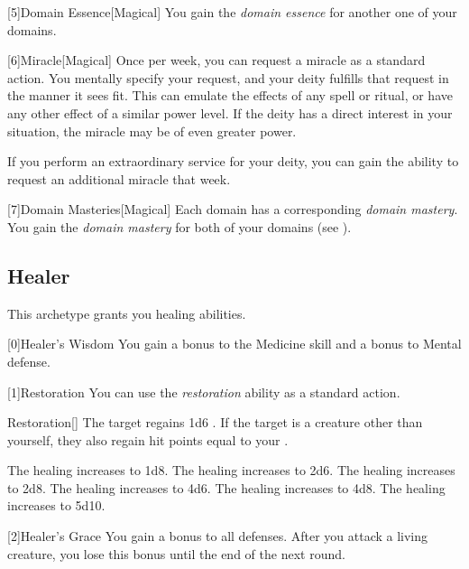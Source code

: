         [5]{Domain Essence}[Magical]
        You gain the \textit{domain essence} for another one of your domains.

        [6]{Miracle}[Magical]
        Once per week, you can request a miracle as a standard action.
        You mentally specify your request, and your deity fulfills that request in the manner it sees fit.
        This can emulate the effects of any spell or ritual, or have any other effect of a similar power level.
        If the deity has a direct interest in your situation, the miracle may be of even greater power.

        If you perform an extraordinary service for your deity, you can gain the ability to request an additional miracle that week.

        [7]{Domain Masteries}[Magical]
        Each domain has a corresponding \textit{domain mastery}.
        You gain the \textit{domain mastery} for both of your domains (see ).

    \newpage
    \subsection{Healer}
        This archetype grants you healing abilities.

        [0]{Healer's Wisdom} You gain a  bonus to the Medicine skill and a  bonus to Mental defense.

        [1]{Restoration} You can use the \textit{restoration} ability as a standard action.
        \begin{freeability}{Restoration}[]
            The target regains 1d6 .
            If the target is a creature other than yourself, they also regain hit points equal to your .

            \rankline
             The healing increases to 1d8.
             The healing increases to 2d6.
             The healing increases to 2d8.
             The healing increases to 4d6.
             The healing increases to 4d8.
             The healing increases to 5d10.
        \end{freeability}

        [2]{Healer's Grace} You gain a  bonus to all defenses.
        After you attack a living creature, you lose this bonus until the end of the next round.

